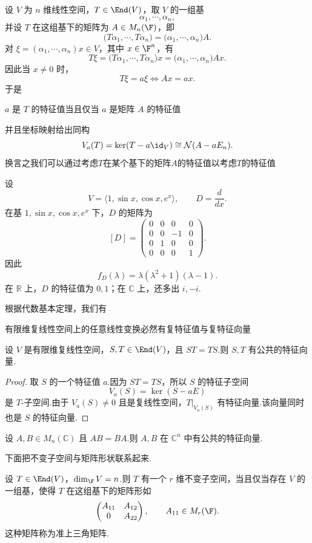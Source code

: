 设 $V$ 为 $n$ 维线性空间，$T\in\End(V)$，取 $V$ 的一组基
\[
\alpha_1,\cdots,\alpha_n,
\]
并设 $T$ 在这组基下的矩阵为 $A\in M_n(\F)$，即
\[
\bigl(T\alpha_1,\cdots,T\alpha_n\bigr)
=\bigl(\alpha_1,\cdots,\alpha_n\bigr)A.
\]
对 $\xi=(\alpha_1,\cdots,\alpha_n)x\in V$，其中 $x\in\F^n$，有
\[
T\xi
=\bigl(T\alpha_1,\cdots,T\alpha_n\bigr)x
=\bigl(\alpha_1,\cdots,\alpha_n\bigr)Ax.
\]
因此当 $x\neq0$ 时，
\[
T\xi=a\xi
\Longleftrightarrow
Ax=ax.
\]
于是 
\begin{corollary}
$a$ 是 $T$ 的特征值当且仅当 $a$ 是矩阵 $A$ 的特征值
\end{corollary}
并且坐标映射给出同构
\[
V_a(T)=\ker(T-a\id_V)
\cong
\mathcal N(A-aE_n).
\]
换言之我们可以通过考虑$T$在某个基下的矩阵$A$的特征值以考虑$T$的特征值
\begin{example}
设
\[
V=\langle 1,\sin x,\cos x,e^x\rangle,
\qquad D=\frac{d}{dx}.
\]
在基 $1,\sin x,\cos x,e^x$ 下，$D$ 的矩阵为
\[
[D]=
\begin{pmatrix}
	0&0&0&0\\
	0&0&-1&0\\
	0&1&0&0\\
	0&0&0&1
\end{pmatrix}.
\]
因此
\[
f_D(\lambda)=\lambda(\lambda^2+1)(\lambda-1).
\]
在 $\mathbb R$ 上，$D$ 的特征值为 $0,1$；在 $\mathbb C$ 上，还多出 $i,-i$.
\end{example}
根据代数基本定理，我们有
\begin{corollary}
	有限维复线性空间上的任意线性变换必然有复特征值与复特征向量
\end{corollary}
\begin{corollary}
设 $V$ 是有限维复线性空间，$S,T\in\End(V)$，且 $ST=TS$.则 $S,T$ 有公共的特征向量.
\end{corollary}

\begin{proof}
取 $S$ 的一个特征值 $a$.因为 $ST=TS$，所以 $S$ 的特征子空间
\[
V_a(S)=\ker(S-aE)
\]
是 $T$-子空间.由于 $V_a(S)\neq0$ 且是复线性空间，$T|_{V_a(S)}$ 有特征向量.该向量同时也是 $S$ 的特征向量.
\end{proof}

\begin{corollary}
设 $A,B\in M_n(\mathbb C)$ 且 $AB=BA$.则 $A,B$ 在 $\mathbb C^n$ 中有公共的特征向量.
\end{corollary}


下面把不变子空间与矩阵形状联系起来.

\begin{lemma}
设 $T\in\End(V)$，$\dim_{\F}V=n$.则 $T$ 有一个 $r$ 维不变子空间，当且仅当存在 $V$ 的一组基，使得 $T$ 在这组基下的矩阵形如
\[
\begin{pmatrix}
	A_{11}&A_{12}\\
	0&A_{22}
\end{pmatrix},
\qquad A_{11}\in M_r(\F).
\]
这种矩阵称为准上三角矩阵.
\end{lemma}

